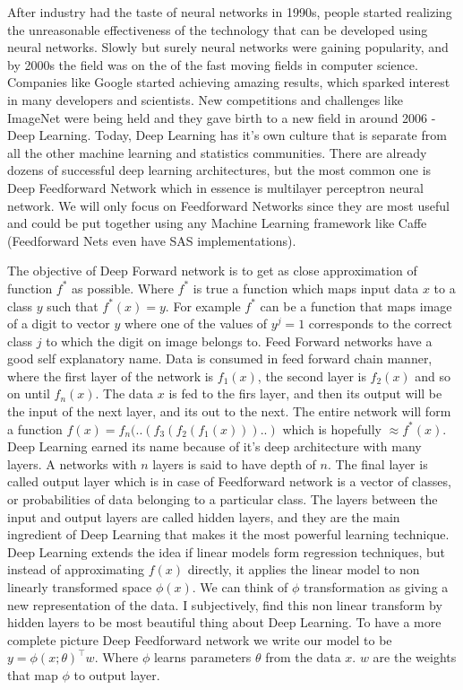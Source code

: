 \documentclass[paper=a4, fontsize=11pt]{scrartcl}
\numberwithin{equation}{section}		%
\numberwithin{figure}{section}			%
\numberwithin{table}{section}			%
\begin{document}
	\newline After industry had the taste of neural networks in 1990s, people started realizing the unreasonable effectiveness of the technology that can be developed using neural networks. Slowly but surely neural networks were gaining popularity, and by 2000s the field was on the of the fast moving fields in computer science. Companies like Google started achieving amazing results, which sparked interest in many developers and scientists. New competitions and challenges like ImageNet were being held and they gave birth to a new field in around 2006 - Deep Learning. Today, Deep Learning has it's own culture that is separate from all the other machine learning and statistics communities. There are already dozens of successful deep learning architectures, but the most common one is Deep Feedforward Network which in essence is multilayer perceptron neural network. We will only focus on Feedforward Networks since they are most useful and could be put together using any Machine Learning framework like Caffe (Feedforward Nets even have SAS implementations).
	\par 
		The objective of Deep Forward network is to get as close approximation of function $f^*$ as possible. Where $f^*$ is true a function which maps input data $x$ to a class $y$ such that $ f^*(x) = y $. For example $f^*$ can be a function that maps image of a digit to vector $y$ where one of the values of $y^j = 1$ corresponds to the correct class $j$ to which the digit on image belongs to.
	Feed Forward networks have a good self explanatory name. Data is consumed in feed forward chain manner, where the first layer of the network is $f_1(x)$, the second layer is $f_2(x)$ and so on until $f_n(x)$. The data $x$ is fed to the firs layer, and then its output will be the input of the next layer, and its out to the next. The entire network will form a function $f(x) = f_n(..(f_3(f_2(f_1(x)))..) $ which is hopefully $\approx f^*(x)$. Deep Learning earned its name because of it's deep architecture with many layers. A networks with $n$ layers is said to have depth of $n$. The final layer is called output layer which is in case of Feedforward network is a vector of classes, or probabilities of data belonging to a particular class. The layers between the input and output layers are called hidden layers, and they are the main ingredient of Deep Learning that makes it the most powerful learning technique. Deep Learning extends the idea if linear models form regression techniques, but instead of approximating $f(x)$ directly, it applies the linear model to non linearly transformed space $\phi(x)$. We can think of $\phi$ transformation as giving a new representation of the data. I subjectively, find this non linear transform by hidden layers to be most beautiful thing about Deep Learning. To have a more complete picture Deep Feedforward network we write our model to be $y = \phi(x;\theta)^\top w $. Where $\phi$ learns parameters $\theta$ from the data $x$. $w$ are the weights that map $\phi$ to output layer.
\end{document}
